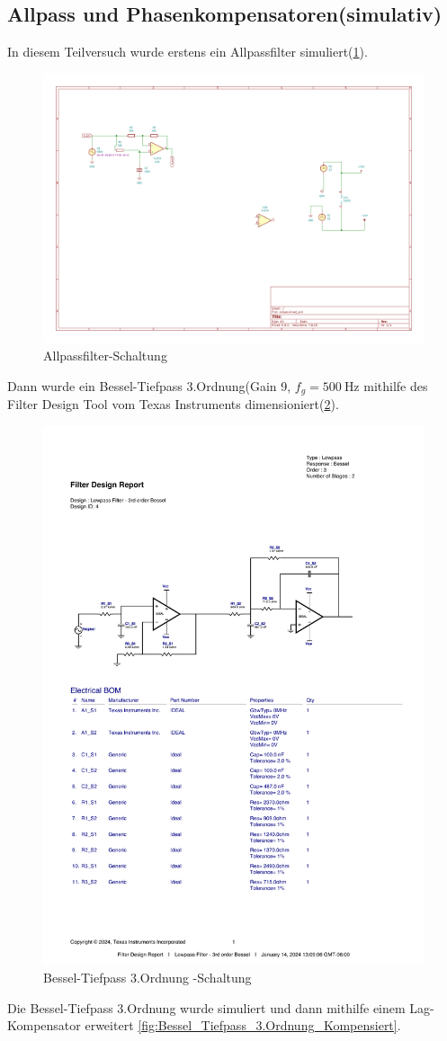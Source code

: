 \subsection{Allpass und Phasenkompensatoren(simulativ)}
%
In diesem Teilversuch wurde erstens ein Allpassfilter simuliert(\ref{fig:Allpass_circuit}).
%
\begin{figure}[H]
 \centering
 \includegraphics[width=0.7\linewidth]{Elektronik-Laborprotokoll_Filter/Circuits/allpas_circuit.pdf}
 \caption{ Allpassfilter-Schaltung}
 \label{fig:Allpass_circuit}
\end{figure}
%
Dann wurde ein Bessel-Tiefpass 3.Ordnung(Gain 9, $f_g=\SI{500}{\hertz}$  mithilfe des Filter Design Tool vom Texas Instruments \cite{Texas_Instruments} dimensioniert(\ref{fig:Bessel_Tiefpass_3.Ordnung}).
%
\begin{figure}[H]
 \centering
 \includegraphics[width=0.7\linewidth]{Elektronik-Laborprotokoll_Filter/Circuits/Bessel_3.Ordnung_Filter_Tool.pdf}
 \caption{ Bessel-Tiefpass 3.Ordnung -Schaltung}
 \label{fig:Bessel_Tiefpass_3.Ordnung}
\end{figure}
%
Die Bessel-Tiefpass 3.Ordnung wurde simuliert und dann mithilfe einem Lag-Kompensator erweitert \ref{fig:Bessel_Tiefpass_3.Ordnung_Kompensiert}. 


